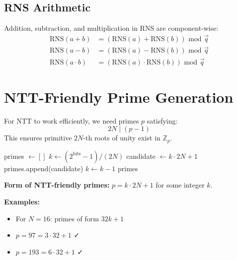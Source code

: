 \documentclass[11pt,a4paper]{article}
\newcommand{\Z}{\mathbb{Z}}
\newcommand{\bmod}{\text{ mod }}
\begin{document}
\subsection{RNS Arithmetic}

Addition, subtraction, and multiplication in RNS are component-wise:
\begin{align}
\text{RNS}(a + b) &= (\text{RNS}(a) + \text{RNS}(b)) \bmod \vec{q} \\
\text{RNS}(a - b) &= (\text{RNS}(a) - \text{RNS}(b)) \bmod \vec{q} \\
\text{RNS}(a \cdot b) &= (\text{RNS}(a) \cdot \text{RNS}(b)) \bmod \vec{q}
\end{align}

\section{NTT-Friendly Prime Generation}

For NTT to work efficiently, we need primes $p$ satisfying:
\[
2N \mid (p - 1)
\]
This ensures primitive $2N$-th roots of unity exist in $\Z_p$.

\begin{algorithm}[H]
\caption{Generate NTT-Friendly Prime Chain}
\begin{algorithmic}[1]
    \State primes $\gets []$
    \State $k \gets (2^{\text{bits}} - 1) / (2N)$ 
        \State candidate $\gets k \cdot 2N + 1$
            \State primes.append(candidate)
        \EndIf
        \State $k \gets k - 1$
    \EndWhile
    \State \Return primes
\EndFunction
\end{algorithmic}
\end{algorithm}

\textbf{Form of NTT-friendly primes:} $p = k \cdot 2N + 1$ for some integer $k$.

\textbf{Examples:}
\begin{itemize}
    \item For $N = 16$: primes of form $32k + 1$
    \item $p = 97 = 3 \cdot 32 + 1$ ✓
    \item $p = 193 = 6 \cdot 32 + 1$ ✓
\end{itemize}
\end{document}
